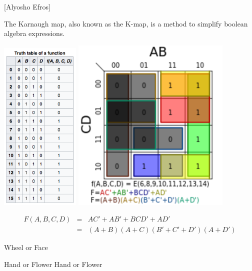 {\centerline{[Alyosho Efros]}


The Karnaugh map, also known as the K-map, is a method to simplify boolean algebra expressions.

\vfil
\centerline{\includegraphics[width = 1.5in]{../images/Kmap1} \hspace{1.0in} \includegraphics[width=3.0in]{../images/Kmap2}}

\begin{eqnarray*}
  F(A,B,C,D) & = & AC' + AB' + BCD' + AD' \\
  & = & (A+B)(A+C)(B' + C' + D')(A+D')
\end{eqnarray*}


{\color{red}
  
\centerline{Wheel or Face}

\vfill
\centerline{Hand or Flower \hspace{1in} Hand or Flower}

}}
